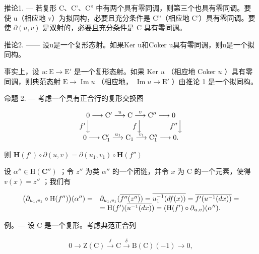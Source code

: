 推论1. --- 若复形 C、C'、C'' 中有两个具有零同调，则第三个也具有零同调。要使 u（相应地 v）为拟同构，必要且充分条件是 C''（相应地 C'）具有零同调。要使 \(\partial(u, v)\) 是双射的，必要且充分条件是 C 具有零同调。

推论2. —— 设u是一个复形态射。如果Ker u和Coker u具有零同调，则u是一个拟同构。

事实上，设 \(u: \mathrm{E} \to \mathrm{E}'\) 是一个复形态射。如果 Ker \(u\) （相应地 Coker \(u\) ）具有零同调，则典范态射 \(\mathrm{E} \to \operatorname{Im} u\) （相应地， \(\operatorname{Im} u \to \mathrm{E}'\) ）由推论 1 是一个拟同构。

命题 2. — 考虑一个具有正合行的复形交换图

\[
\begin{array}{c} 0 \longrightarrow \mathrm{C} ^ {\prime} \stackrel {{u}} {{\longrightarrow}} \mathrm{C} \stackrel {{v}} {{\longrightarrow}} \mathrm{C} ^ {\prime \prime} \longrightarrow 0 \\ f ^ {\prime} \Big \downarrow \qquad \qquad \qquad f \Big \downarrow \qquad \qquad f ^ {\prime \prime} \Big \downarrow \\ 0 \longrightarrow \mathrm{C} _ {1} ^ {\prime} \stackrel {{u _ {1}}} {{\longrightarrow}} \mathrm{C} _ {1} \stackrel {{v _ {1}}} {{\longrightarrow}} \mathrm{C} _ {1} ^ {\prime \prime} \longrightarrow 0. \end{array}
\]

则 \(\mathbf{H}(f')\circ \partial (u,v) = \partial (u_1,v_1)\circ \mathbf{H}(f'')\)

设 \(\alpha'' \in \mathrm{H}(\mathbf{C}'')\) ；令 \(z''\) 为类 \(\alpha''\) 的一个闭链，并令 \(x\) 为 C 的一个元素，使得 \(v(x) = z''\) ；我们有

\[
\begin{array}{r l} \big (\partial_ {u _ {1}, v _ {1}} \circ \mathrm{H} (f ^ {\prime \prime}) \big) (\alpha^ {\prime \prime}) = & \partial_ {u _ {1}, v _ {1}} (\overline {{f ^ {\prime \prime} (z ^ {\prime \prime})}}) = \overline {{u _ {1} ^ {- 1} (d f (x))}} = \overline {{f ^ {\prime} (u ^ {- 1} (d x))}} = \\ & = \mathrm{H} (f ^ {\prime}) (\overline {{u ^ {- 1} (d x)}}) = (\mathrm{H} (f ^ {\prime}) \circ \partial_ {u, v}) (\alpha^ {\prime \prime}). \end{array}
\]

例。— 设 C 是一个复形。考虑典范正合列

\[
0 \longrightarrow \mathrm{Z} (\mathrm{C}) \stackrel {j} {\longrightarrow} \mathrm{C} \stackrel {\delta} {\longrightarrow} \mathrm{B} (\mathrm{C}) (- 1) \longrightarrow 0,\tag{I}
\]

